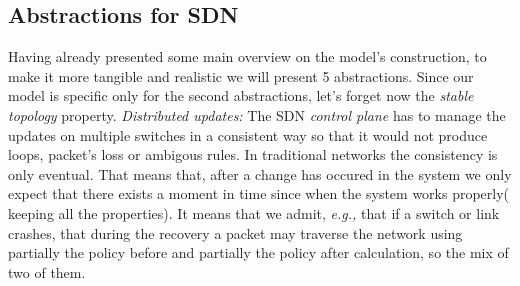 \documentclass{article}
\theoremstyle{remark}
\begin{document}
\subsection{Abstractions for SDN}
Having already presented some main overview on the model's construction, to make it more tangible and realistic we will present 5 abstractions. Since our model is specific only for the second abstractions, let's forget now the \emph{stable topology} property.
 \emph{Distributed updates:}
The SDN \emph{control plane} has to manage the updates on multiple switches in a consistent way so that it would not produce loops, packet's loss or ambigous rules. 
In traditional networks the consistency is only eventual. That means that, after a change has occured in the system we only expect that there exists a moment in time since when the system works properly( keeping all the properties). It means that we admit, \emph{e.g.,} that if a switch or link crashes, that during the recovery a packet may traverse the network using partially the policy before and partially the policy after calculation, so the mix of two of them. 
\end{document}
